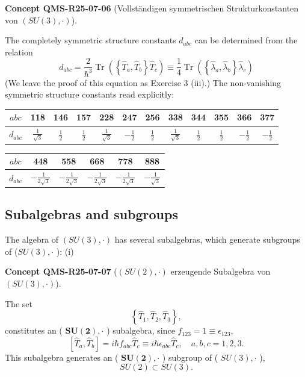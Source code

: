 \documentclass[10pt, letterpaper]{article}
\newcommand{\CustomHeading}[3]{%
  \par\medskip\noindent%
  \textbf{#1 #2} \textnormal{(#3)}.\enskip%
}
\newenvironment{CONC}[2]{\begin{unitbox}\CustomHeading{Concept}{#1}{#2}}{\end{unitbox}}
\begin{document}
\begin{CONC}{QMS-R25-07-06}{Vollständigen symmetrischen Strukturkonstanten von $(S U(3), \cdot)$}
The completely symmetric structure constants $d_{a b c}$ can be determined from the relation
$$
d_{a b c}=\frac{2}{\hbar^{3}} \operatorname{Tr}\left(\left\{\hat{T}_{a}, \hat{T}_{b}\right\} \hat{T}_{c}\right) \equiv \frac{1}{4} \operatorname{Tr}\left(\left\{\hat{\lambda}_{a}, \hat{\lambda}_{b}\right\} \hat{\lambda}_{c}\right)
$$
(We leave the proof of this equation as Exercise 3 (iii).) The non-vanishing symmetric structure constants read explicitly:
\begin{center}
\begin{tabular}{c||c|c|c|c|c|c|c|c|c|c|c}
$a b c$ & 118 & 146 & 157 & 228 & 247 & 256 & 338 & 344 & 355 & 366 & 377 \\
\hline
$d_{a b c}$ & $\frac{1}{\sqrt{3}}$ & $\frac{1}{2}$ & $\frac{1}{2}$ & $\frac{1}{\sqrt{3}}$ & $-\frac{1}{2}$ & $\frac{1}{2}$ & $\frac{1}{\sqrt{3}}$ & $\frac{1}{2}$ & $\frac{1}{2}$ & $-\frac{1}{2}$ & $-\frac{1}{2}$ \\
\hline
\end{tabular}
\end{center}
\begin{center}
\begin{tabular}{c||c|c|c|c|c}
$a b c$ & 448 & 558 & 668 & 778 & 888 \\
\hline
$d_{a b c}$ & $-\frac{1}{2 \sqrt{3}}$ & $-\frac{1}{2 \sqrt{3}}$ & $-\frac{1}{2 \sqrt{3}}$ & $-\frac{1}{2 \sqrt{3}}$ & $-\frac{1}{\sqrt{3}}$ \\
\hline
\end{tabular}
\end{center}
\end{CONC}



\subsection{Subalgebras and subgroups}



The algebra of $(S U(3), \cdot)$ has several subalgebras, which generate subgroups of ($S U(3), \cdot$ ):
(i) 

\begin{CONC}{QMS-R25-07-07}{$(S U(2), \cdot)$ erzeugende Subalgebra von $(S U(3), \cdot)$}
The set
$$
\left\{\hat{T}_{1}, \hat{T}_{2}, \hat{T}_{3}\right\},
$$
constitutes an ( $\boldsymbol{S U}(\mathbf{2}), \cdot$ ) subalgebra, since $f_{123}=1 \equiv \epsilon_{123}$,
$$
\left[\hat{T}_{a}, \hat{T}_{b}\right]=i \hbar f_{a b c} \hat{T}_{c} \equiv i \hbar \epsilon_{a b c} \hat{T}_{c}, \quad a, b, c=1,2,3 .
$$
This subalgebra generates an ( $\boldsymbol{S U}(\mathbf{2}), \cdot$ ) subgroup of ( $S U(3), \cdot$ ),
$$
S U(2) \subset S U(3) .
$$
\end{CONC}
\end{document}
